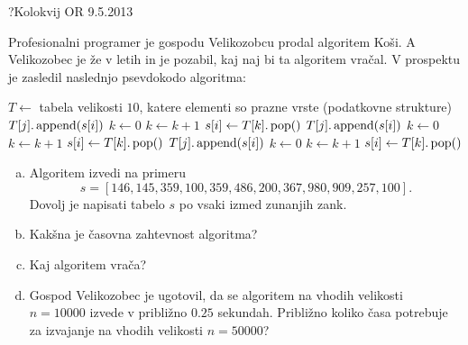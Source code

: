 \begin{naloga}{?}{Kolokvij OR 9.5.2013}
\begin{vprasanje}[kosi]
Profesionalni programer je gospodu Velikozobcu prodal algoritem {\sc Koši}.
A Velikozobec je že v letih in je pozabil, kaj naj bi ta algoritem vračal.
V prospektu je zasledil naslednjo psevdokodo algoritma:
\begin{small}
\begin{algorithmic}
\State $T \gets$ tabela velikosti $10$,
    katere elementi so prazne vrste (podatkovne strukture)
            \State $T[j].\operatorname{append}(s[i])$
        \EndIf
    \EndFor
\EndFor
\State $k \gets 0$
        \State $k \gets k+1$
    \EndWhile
    \State $s[i] \gets T[k].\operatorname{pop}()$
\EndFor
{}
            \State $T[j].\operatorname{append}(s[i])$
        \EndIf
    \EndFor
\EndFor
\State $k \gets 0$
        \State $k \gets k+1$
    \EndWhile
    \State $s[i] \gets T[k].\operatorname{pop}()$
\EndFor
{}
            \State $T[j].\operatorname{append}(s[i])$
        \EndIf
    \EndFor
\EndFor
\State $k \gets 0$
        \State $k \gets k+1$
    \EndWhile
    \State $s[i] \gets T[k].\operatorname{pop}()$
\EndFor
\State {}
\end{algorithmic}
\end{small}

\begin{enumerate}[(a)]
\item Algoritem izvedi na primeru
$$
s = [146, 145, 359, 100, 359, 486, 200, 367, 980, 909, 257, 100] .
$$
Dovolj je napisati tabelo $s$ po vsaki izmed zunanjih zank.

\item Kakšna je časovna zahtevnost algoritma?

\item Kaj algoritem vrača?

\item Gospod Velikozobec je ugotovil,
da se algoritem na vhodih velikosti $n = 10000$
izvede v približno $0.25$ sekundah.
Približno koliko časa potrebuje za izvajanje na vhodih velikosti $n = 50000$?
\end{enumerate}
\end{vprasanje}
\begin{odgovor}
\end{odgovor}
\end{naloga}


